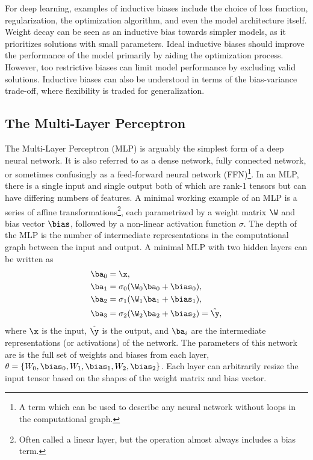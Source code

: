 For deep learning, examples of inductive biases include the choice of loss function, regularization, the optimization algorithm, and even the model architecture itself.
Weight decay can be seen as an inductive bias towards simpler models, as it prioritizes solutions with small parameters.
Ideal inductive biases should improve the performance of the model primarily by aiding the optimization process.
However, too restrictive biases can limit model performance by excluding valid solutions.
Inductive biases can also be understood in terms of the bias-variance trade-off, where flexibility is traded for generalization.

\subsection{The Multi-Layer Perceptron}

The Multi-Layer Perceptron (MLP) is arguably the simplest form of a deep neural network.
It is also referred to as a dense network, fully connected network, or sometimes confusingly as a feed-forward neural network (FFN)\footnote{A term which can be used to describe any neural network without loops in the computational graph.}.
In an MLP, there is a single input and single output both of which are rank-1 tensors but can have differing numbers of features.
A minimal working example of an MLP is a series of affine transformations\footnote{Often called a linear layer, but the operation almost always includes a bias term.}, each parametrized by a weight matrix $\W$ and bias vector $\bias$, followed by a non-linear activation function $\sigma$.
The depth of the MLP is the number of intermediate representations in the computational graph between the input and output.
A minimal MLP with two hidden layers can be written as
\begin{align}
    \ba_0 & = \x,                                        \\
    \ba_1 & = \sigma_0(\W_0 \ba_0 + \bias_0),            \\
    \ba_2 & = \sigma_1(\W_1 \ba_1 + \bias_1),            \\
    \ba_3 & = \sigma_2(\W_2 \ba_2 + \bias_2) = \hat{\y},
\end{align}
where $\x$ is the input, $\hat{\y}$ is the output, and $\ba_i$ are the intermediate representations (or activations) of the network.
The parameters of this network are is the full set of weights and biases from each layer, $\theta = \{W_0, \bias_0, W_1, \bias_1, W_2, \bias_2\}$.
Each layer can arbitrarily resize the input tensor based on the shapes of the weight matrix and bias vector.

